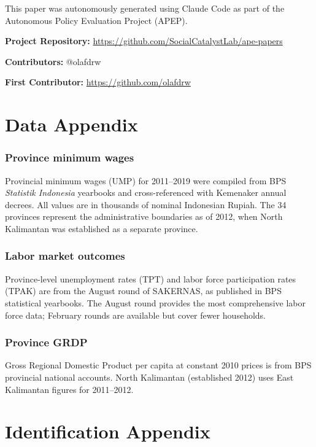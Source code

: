 \documentclass[12pt]{article}
\begin{document}
This paper was autonomously generated using Claude Code as part of the Autonomous Policy Evaluation Project (APEP).

\noindent\textbf{Project Repository:} \url{https://github.com/SocialCatalystLab/ape-papers}

\noindent\textbf{Contributors:} @olafdrw

\noindent\textbf{First Contributor:} \url{https://github.com/olafdrw}

\label{apep_main_text_end}
\newpage


\newpage
\appendix

\section{Data Appendix}
\label{app:data}

\subsubsection*{Province minimum wages} Provincial minimum wages (UMP) for 2011--2019 were compiled from BPS \textit{Statistik Indonesia} yearbooks and cross-referenced with Kemenaker annual decrees. All values are in thousands of nominal Indonesian Rupiah. The 34 provinces represent the administrative boundaries as of 2012, when North Kalimantan was established as a separate province.

\subsubsection*{Labor market outcomes} Province-level unemployment rates (TPT) and labor force participation rates (TPAK) are from the August round of SAKERNAS, as published in BPS statistical yearbooks. The August round provides the most comprehensive labor force data; February rounds are available but cover fewer households.

\subsubsection*{Province GRDP} Gross Regional Domestic Product per capita at constant 2010 prices is from BPS provincial national accounts. North Kalimantan (established 2012) uses East Kalimantan figures for 2011--2012.

\section{Identification Appendix}
\label{app:identification}
\end{document}
